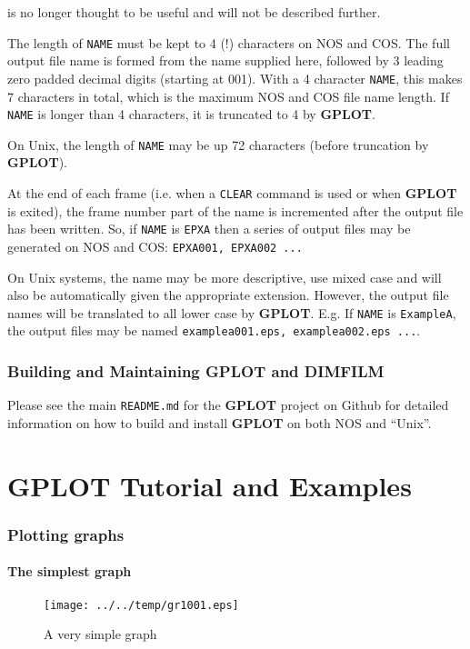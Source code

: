 \documentclass[a4paper,twoside,11pt]{article}
\makeatletter
\def\maxwidth{%
  \ifdim\Gin@nat@width>\linewidth
    \linewidth
  \else
    \Gin@nat@width
  \fi
}
\newcommand{\newpara}{\par\vspace{4mm}\noindent}
\makeatother
\begin{document}
is no longer thought to be useful and will not be described further.
\newpara
The length of \texttt{NAME} must be kept to 4 (!) characters on NOS and COS. The full output file name is formed from
the name supplied here, followed by 3 leading zero padded decimal digits (starting at 001). With a 4 character
\texttt{NAME}, this makes 7 characters in total, which is the maximum NOS and COS file name length. If \texttt{NAME} is longer than 4
characters, it is truncated to 4 by \textbf{GPLOT}.
\newpara
On Unix, the length of \texttt{NAME} may be up 72 characters (before truncation by \textbf{GPLOT}). 
\newpara
At the end of each frame (i.e. when a \texttt{CLEAR} command is used or when \textbf{GPLOT} is exited), the frame number part
of the name is incremented after the output file has been written. So, if \texttt{NAME} is \texttt{EPXA} then a series of
output files may be generated on NOS and COS: \texttt{EPXA001, EPXA002 ...}
\newpara
On Unix systems, the name may be more descriptive, use mixed case and will also be automatically given the 
appropriate extension. However, the output file names will be translated to all
lower case by \textbf{GPLOT}. E.g. If \texttt{NAME} is \texttt{ExampleA}, the output files may be named
\texttt{examplea001.eps, examplea002.eps ...}.

\section{Building and Maintaining \textbf{GPLOT} and \textbf{DIMFILM}}

Please see the main \texttt{README.md} for the \textbf{GPLOT} project on Github
for detailed information on how to build and install \textbf{GPLOT} on both NOS
and ``Unix''.

\clearpage
\part{GPLOT Tutorial and Examples}
\clearpage

\section{Plotting graphs}

\subsection{The simplest graph}

\begin{figure}
  \centering
  \texttt{[image: ../../temp/gr1001.eps]}
  \caption{A very simple graph}
  \label{fig:gr1001}
\end{figure}
\end{document}
